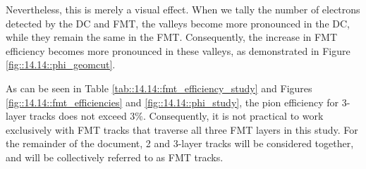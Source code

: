     Nevertheless, this is merely a visual effect.
    When we tally the number of electrons detected by the DC and FMT, the valleys become more pronounced in the DC, while they remain the same in the FMT.
    Consequently, the increase in FMT efficiency becomes more pronounced in these valleys, as demonstrated in Figure \ref{fig::14.14::phi_geomcut}.

    As can be seen in Table \ref{tab::14.14::fmt_efficiency_study} and Figures \ref{fig::14.14::fmt_efficiencies} and \ref{fig::14.14::phi_study}, the pion efficiency for 3-layer tracks does not exceed $3\%$.
    Consequently, it is not practical to work exclusively with FMT tracks that traverse all three FMT layers in this study.
    For the remainder of the document, 2 and 3-layer tracks will be considered together, and will be collectively referred to as FMT tracks.
